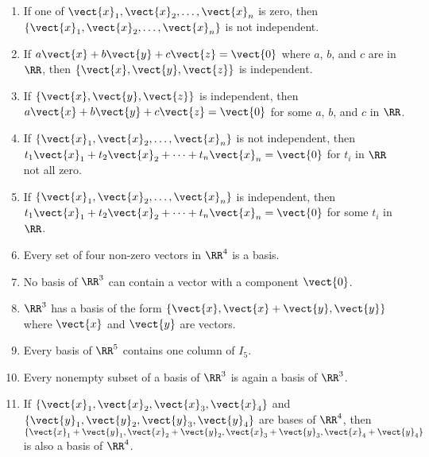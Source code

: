 \begin{multicols}{2}
\begin{supex}
\begin{enumerate}[label={\alph*.}]
\item If one of $\vect{x}_{1}, \vect{x}_{2}, \dots, \vect{x}_{n}$ is zero, then $\{\vect{x}_{1}, \vect{x}_{2}, \dots, \vect{x}_{n}\}$ is not independent.

\item If $a\vect{x} + b\vect{y} + c\vect{z} = \vect{0}$ where $a$, $b$, and $c$ are in $\RR$, then $\{\vect{x}, \vect{y}, \vect{z}\}$ is independent.

\item If $\{\vect{x}, \vect{y}, \vect{z}\}$ is independent, then $a\vect{x} + b\vect{y} + c\vect{z} = \vect{0}$ for some $a$, $b$, and $c$ in $\RR$.

\item If $\{\vect{x}_{1}, \vect{x}_{2}, \dots, \vect{x}_{n}\}$ is not independent, then \newline $t_{1}\vect{x}_{1} + t_{2}\vect{x}_{2} + \dots + t_{n}\vect{x}_{n} = \vect{0}$ for $t_{i}$ in $\RR$ not all zero.

\item If $\{\vect{x}_{1}, \vect{x}_{2}, \dots, \vect{x}_{n}\}$ is independent, then \newline $t_{1}\vect{x}_{1} + t_{2}\vect{x}_{2} + \dots + t_{n}\vect{x}_{n} = \vect{0}$ for some $t_{i}$ in $\RR$.

\item Every set of four non-zero vectors in $\RR^4$ is a basis.

\item No basis of $\RR^3$ can contain a vector with a component $\vect{0}$.

\item $\RR^3$ has a basis of the form $\{\vect{x}, \vect{x} + \vect{y}, \vect{y}\}$ where $\vect{x}$ and $\vect{y}$ are vectors.

\item Every basis of $\RR^5$ contains one column of $I_{5}$.

\item Every nonempty subset of a basis of $\RR^3$ is again a basis of $\RR^3$.

\item If $\{\vect{x}_{1}, \vect{x}_{2}, \vect{x}_{3}, \vect{x}_{4}\}$ and $\{\vect{y}_{1}, \vect{y}_{2}, \vect{y}_{3}, \vect{y}_{4}\}$ are bases of $\RR^4$, then $\{\vect{x}_{1} + \vect{y}_{1}, \vect{x}_{2} + \vect{y}_{2}, \vect{x}_{3} + \vect{y}_{3}, \vect{x}_{4} + \vect{y}_{4}\}$ is also a basis of $\RR^4$.

\end{enumerate}


\end{supex}
\end{multicols}
